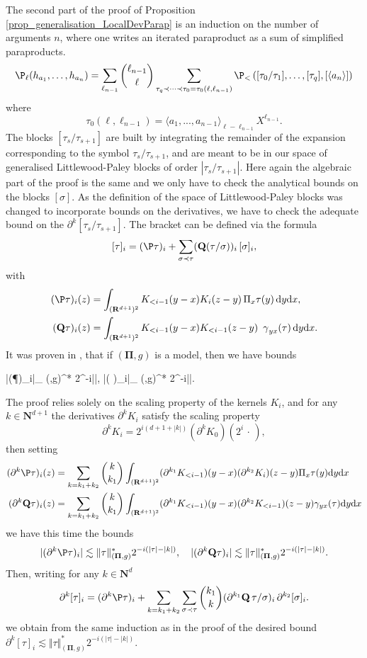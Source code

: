 \documentclass[11pt]{preprint}
\def\PPi{\boldsymbol{\Pi}}
\renewcommand{\lg}{\langle}
\newcommand{\rg}{\rangle}
\newcommand{\bfN}{\mathbf{N}}
\newcommand{\bfR}{\mathbf{R}}
\newcommand{\ddd}{ \text{d} }
\begin{document}
\begin{appendix}
	The second part of the proof of Proposition \ref{prop_generalisation_LocalDevParap} is an induction on the number of arguments $n$, where one writes an iterated paraproduct as a sum of simplified paraproducts.
	$$
	 \P_\ell(h_{a_1},\dots,h_{a_n}) = \sum_{\ell_{n-1}} { \ell_{n-1} \choose \ell  } \sum_{\tau_q\prec\dots\prec\tau_0 =\tau_0(\ell,\ell_{n-1}) } \P_< \left( [\tau_0/\tau_1 ] ,\dots,[\tau_q] , [\langle a_n \rangle]  \right)
	$$
	where $$\tau_0(\ell,\ell_{n-1}) = \lg a_1,...,a_{n-1}\rg_{\ell-\ell_{n-1}}X^{\ell_{n-1}}. $$ 
	The blocks $[\tau_s/\tau_{s+1}]$ are built by integrating the remainder of the expansion corresponding to the symbol $\tau_s/\tau_{s+1}$, and are meant to be in our space of generalised Littlewood-Paley blocks of order $|\tau_s/\tau_{s+1}|$.
	Here again the algebraic part of the proof is the same and we only have to check the analytical bounds on the blocks $[\sigma]$.
	 As the definition of the space of Littlewood-Paley blocks was changed to incorporate bounds on the derivatives, we have to check the adequate bound on the $\partial ^k[\tau_s/\tau_{s+1}]$.
The bracket can be defined via the formula
	$$
	[\tau]_i = (\P \tau)_i + \sum_{\sigma\prec\tau} ({\bf Q}(\tau/\sigma))_i \, [\sigma]_i,
	$$
	with 
	\begin{align*}
	(\P \tau)_i(z) &= \int_{(\bfR^{d+1})^2} K_{<i-1}(y-x)K_i(z-y) \, {\Pi}_x\tau(y) \,  \ddd y \ddd x,
	\\
		(\mathbf{Q} \tau)_i(z) &= \int_{(\bfR^{d+1})^2} K_{<i-1}(y-x)K_{<i-1}(z-y) \, {\ \gamma}_{yx}(\tau) \, \ddd y \ddd x.
\end{align*}
It was proven in \cite[Proposition 8]{BailleulHoshinoRS1}, that if $(\PPi, { g})$ is a model, then we have bounds \begin{equs}
	|(\P \tau)_i|\lesssim \Vert\tau\Vert_{ (\PPi,g)}^* 2^{-i|\tau|}, \quad |( \tau)_i|\lesssim \Vert\tau\Vert_{ (\PPi,g)}^* 2^{-i|\tau|}.
	\end{equs} The proof relies solely on the scaling property of the kernels $K_i$, and for any $k\in\bfN^{d+1}$ the derivatives $\partial^k K_i$ satisfy the scaling property $$	\partial^kK_i = 2^{i(d +1+|k|)}(\partial^kK_0)( 2^i \, \cdot \, ),$$ then setting 
	\begin{align*}
	(\partial^k\P  \tau)_i(z) &=\sum_{k=k_1+k_2} \binom{k}{k_1} \int_{(\bfR^{d+1})^2} (\partial^{k_1}K_{<i-1})(y-x)(\partial^{k_2}K_i)(z-y) {\Pi}_x\tau(y) \ddd y \ddd x
	\\
	(\partial^k\mathbf{Q}  \tau)_i(z) &= \sum_{k=k_1+k_2} \binom{k}{k_1}  \int_{(\bfR^{d+1})^2} (\partial^{k_1}K_{<i-1})(y-x)(\partial^{k_2}K_{<i-1})(z-y) { \gamma}_{yx}(\tau) \ddd y \ddd x
\end{align*}
we have this time the bounds $$|(\partial^k\P \tau)_i|\lesssim \Vert\tau\Vert_{ (\PPi,g)}^* 2^{-i(|\tau|-|k|)}, \quad  |(\partial^k\mathbf{Q} \tau)_i|\lesssim \Vert\tau\Vert_{ (\PPi,g)}^* 2^{-i(|\tau|-|k|)}.$$ Then, writing for any $k\in\bfN^d $ 
		$$
	\partial^k[\tau]_i= (\partial^k\P \tau)_i + \sum_{k=k_1+k_2}\sum_{\sigma\prec\tau} \binom{k_1}{k} (\partial^{k_1}{\bf Q}\, \tau/\sigma)_i \, \partial^{k_2}[\sigma]_i.
	$$
	we obtain from the same induction as in the proof of \cite[Proposition 18]{LocalExpansionsParacSystems} the desired bound $\partial^k[\tau]_i \lesssim \Vert\tau\Vert_{ (\PPi,g)}^* 2^{-i(|\tau|-|k|)}.$

\end{appendix}
\end{document}
